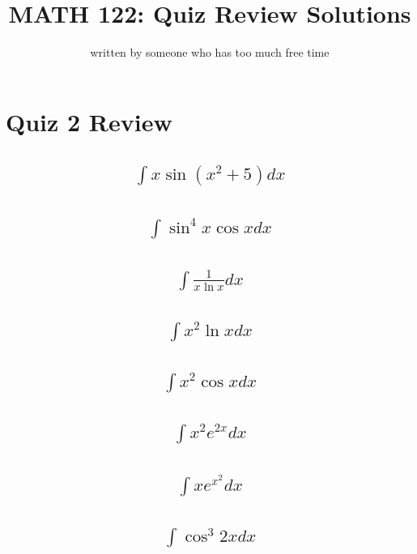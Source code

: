 \documentclass{article}
\title{MATH 122: Quiz Review Solutions}
\author{written by someone who has too much free time}
\begin{document}
\maketitle
\tableofcontents
\newpage

\section{Quiz 2 Review}
\subsection{
	\begin{align*}
		\int{x\sin{(x^2 + 5)}dx}
	\end{align*}
}
\subsection{
	\begin{align*}
		\int{\sin^4{x}\cos{x}dx}
	\end{align*}
}
\subsection{
	\begin{align*}
		\int{\frac{1}{x\ln{x}}dx}
	\end{align*}
}
\subsection{
	\begin{align*}
		\int{x^2 \ln{x}dx}
	\end{align*}
}
\subsection{
	\begin{align*}
		\int{x^2 \cos{x} dx}
	\end{align*}
}
\subsection{
	\begin{align*}
		\int{x^2 e^{2x}dx}
	\end{align*}
}
\subsection{
	\begin{align*}
		\int{xe^{x^2}dx}
	\end{align*}
}
\subsection{
	\begin{align*}
		\int{\cos^3{2x}dx}
	\end{align*}
}
\end{document}
